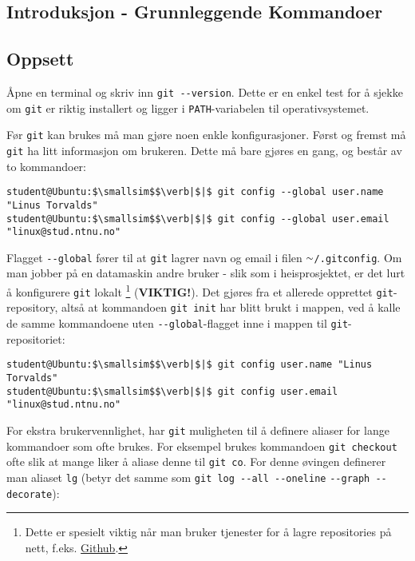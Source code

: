 \begin{alphasection}
\section{Introduksjon - Grunnleggende Kommandoer}\label{sec:innføring}

\subsection{Oppsett}

Åpne en terminal og skriv inn \verb|git --version|. Dette er en enkel test for å sjekke om \verb|git| er riktig installert og ligger i \verb|PATH|-variabelen til operativsystemet.


Før \verb|git| kan brukes må man gjøre noen enkle konfigurasjoner. Først og fremst må \verb|git| ha litt informasjon om brukeren. Dette må bare gjøres en gang, og består av to kommandoer:

\begin{lstlisting}[mathescape=true]
student@Ubuntu:$\smallsim$$\verb|$|$ git config --global user.name "Linus Torvalds"
student@Ubuntu:$\smallsim$$\verb|$|$ git config --global user.email "linux@stud.ntnu.no"
\end{lstlisting}


Flagget \verb|--global| fører til at \verb|git| lagrer navn og email i filen \texttt{$\smallsim$/.gitconfig}. Om man jobber på en datamaskin andre bruker - slik som i heisprosjektet, er det lurt å konfigurere \verb|git| lokalt \footnote{Dette er spesielt viktig når man bruker tjenester for å lagre repositories på nett, f.eks. \href{https://github.com/about}{Github}.} (\textbf{VIKTIG!}). Det gjøres fra et allerede opprettet \verb|git|-repository, altså at kommandoen \verb|git init| har blitt brukt i mappen, ved å kalle de samme kommandoene uten \verb|--global|-flagget inne i mappen til \verb|git|-repositoriet:

\begin{lstlisting}[mathescape=true]
student@Ubuntu:$\smallsim$$\verb|$|$ git config user.name "Linus Torvalds"
student@Ubuntu:$\smallsim$$\verb|$|$ git config user.email "linux@stud.ntnu.no"
\end{lstlisting}

For ekstra brukervennlighet, har \verb|git| muligheten til å definere aliaser for lange kommandoer som ofte brukes. For eksempel brukes kommandoen \verb|git checkout| ofte slik at mange liker å aliase denne til \verb|git co|. For denne øvingen definerer man aliaset \verb|lg| (betyr det samme som \verb|git log --all --oneline| \verb|--graph --decorate|):


\end{alphasection}
